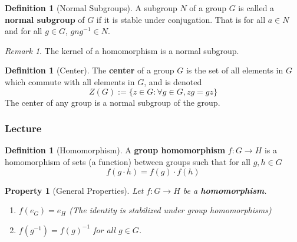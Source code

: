 \documentclass[12pt]{article}
\newtheorem{pro}[thm]{Property}
\theoremstyle{definition}
\newtheorem{defn}[thm]{Definition}
\theoremstyle{remark}
\newtheorem{rmk}[thm]{Remark}
\numberwithin{equation}{section}
\newcommand\B[1]{\textbf{ #1}}
\begin{document}
\vspace{15pt}

\begin{defn}[Normal Subgroups]
        A subgroup $N$ of a group $G$ is called a \B{normal subgroup} of $G$ if it is stable under conjugation. That is for all $a \in N$ and for all $g \in G$, $gng^{-1} \in N$.
\end{defn}
\begin{rmk}
        The kernel of a homomorphism is a normal subgroup.
\end{rmk}

\vspace{15pt}


\begin{defn}[Center]
        The \B{center} of a group $G$ is the set of all elements in $G$ which commute with all elements in $G$, and is denoted \begin{equation}
                Z(G) := \{z \in G:\forall g\in G, zg = gz\}
        \end{equation}
        The center of any group is a normal subgroup of the group.
\end{defn}

\vspace{15pt}



\subsubsection{Lecture}

\begin{defn}[Homomorphism]
        A \B{group homomorphism} $f: G\rightarrow H$ is a homomorphism of sets (a function) between groups such that for all $g,h \in G$ \begin{equation}
                f(g\cdot h) = f(g)\cdot f(h)
        \end{equation}
\end{defn}


\vspace{15pt}


\begin{pro}[General Properties]
        Let $f: G\rightarrow H$ be a \B{homomorphism}. 
        \begin{enumerate}
                \item $f(e_G) = e_H$ (The identity is stabilized under group homomorphisms)
                \item $f(g^{-1}) = f(g)^{-1}$ for all $g \in G$.
        \end{enumerate}
\end{pro}
\end{document}
